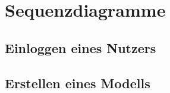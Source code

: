 \documentclass{book}
\begin{document}
\chapter{Sequenzdiagramme}

\section{Einloggen eines Nutzers}


\section{Erstellen eines Modells}

\end{document}
